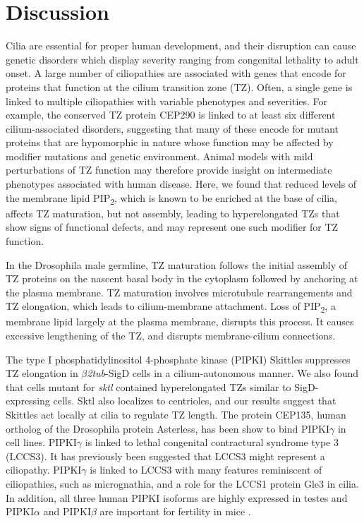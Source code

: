 \documentclass[12pt, twoside, letterpaper]{article}
\newcommand{\PIP}{PIP\textsubscript{2}}
\newcommand{\sigd}{$\beta$\textit{2tub}-SigD}
\begin{document}
\section{Discussion}

Cilia are essential for proper human development, and their disruption
can cause genetic disorders which display severity ranging from congenital
lethality to adult onset.
A large number of ciliopathies are associated with genes that encode for
proteins that function at the cilium transition zone (TZ).
Often, a single gene is linked to multiple ciliopathies with variable phenotypes
and severities.
For example, the conserved TZ protein CEP290 is linked to at least six different
cilium-associated disorders, suggesting that many of these encode for mutant proteins
that are hypomorphic in nature whose function may
be affected by modifier mutations and genetic environment.
Animal models with mild perturbations of TZ function may therefore provide
insight on intermediate phenotypes associated with human disease.
Here, we found that reduced levels of the membrane lipid \PIP{},
which is known to be enriched at the base of cilia,
affects TZ maturation, but not assembly,
leading to hyperelongated TZs that show signs of functional defects, and
may represent one such modifier for TZ function.

In the Drosophila male germline, TZ maturation follows the initial
assembly of TZ proteins on the nascent basal body in the cytoplasm
followed by anchoring at the plasma membrane.
TZ maturation involves microtubule rearrangements and TZ elongation,
which leads to cilium-membrane attachment.
Loss of \PIP{}, a membrane lipid largely at the plasma membrane,
disrupts this process.
It causes excessive lengthening of the TZ,
and disrupts membrane-cilium connections.

The type I phosphatidylinositol 4-phosphate kinase (PIPKI) Skittles
suppresses TZ elongation in \sigd{} cells in a cilium-autonomous
manner.
We also found that cells mutant for \textit{sktl} contained hyperelongated
TZs similar to SigD-expressing cells.
Sktl also localizes to centrioles,
and our results suggest that Skittles act locally at cilia to
regulate TZ length.
The protein CEP135, human ortholog of the Drosophila protein
Asterless, has been show to bind PIPKI$\gamma$ in cell lines.
PIPKI$\gamma$ is linked to lethal congenital contractural syndrome
type 3 (LCCS3).
It has previously been suggested that LCCS3 might represent a ciliopathy.
PIPKI$\gamma$ is linked to LCCS3 with many features reminiscent
of ciliopathies, such as micrognathia, and a role for the LCCS1 protein
Gle3 in cilia.
In addition, all three human PIPKI isoforms are highly expressed in testes
and PIPKI$\alpha$ and PIPKI$\beta$ are important for fertility in mice
\citep{hasegawa2012phosphatidylinositol}.
\end{document}
